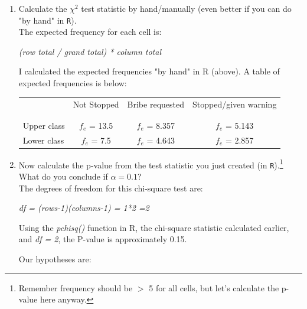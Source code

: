 \documentclass[12pt,letterpaper]{article}
\begin{document}
\begin{enumerate}
	
	\item [(a)]
	Calculate the $\chi^2$ test statistic by hand/manually (even better if you can do "by hand" in \texttt{R}).\\ 
		 
	
	The expected frequency for each cell is: 	\vspace{0.5cm}
	
	\textit{(row total / grand total) * column total}
	
I calculated the expected frequencies "by hand" in R (above). A table of expected frequencies is below: 
\begin{table}[h!]
	\centering
	\begin{tabular}{l | c c c }
		& Not Stopped & Bribe requested & Stopped/given warning \\
		\\[-1.8ex] 
		\hline \\[-1.8ex]
		Upper class & $f_e$ = 13.5 & $f_e$ = 8.357 & $f_e$ = 5.143 \\
		Lower class & $f_e$ = 7.5 & $f_e$ = 4.643 & $f_e$ = 2.857 \\
		\hline
	\end{tabular}
\end{table}
	
		\vspace{0.5cm}
	\item [(b)]
	Now calculate the p-value from the test statistic you just created (in \texttt{R}).\footnote{Remember frequency should be $>$ 5 for all cells, but let's calculate the p-value here anyway.}  What do you conclude if $\alpha = 0.1$?\\
	 
	
	The degrees of freedom for this chi-square test are: 	\vspace{0.5cm}
	
	\textit{df = (rows-1)(columns-1) = 1*2 =2} 	\vspace{0.5cm}
	
	Using the \textit{pchisq()} function in R, the chi-square statistic calculated earlier, and \textit{df = 2}, the P-value is approximately 0.15. \vspace{0.5cm}
	
	Our hypotheses are: \vspace{0.5cm}
	

\end{enumerate}
\end{document}
